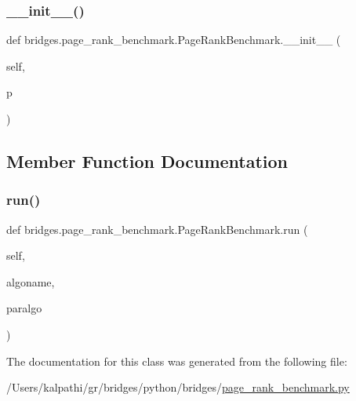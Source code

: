 \subsubsection{\texorpdfstring{\_\_init\_\_()}{\_\_init\_\_()}}
{\footnotesize\ttfamily def bridges.\+page\+\_\+rank\+\_\+benchmark.\+Page\+Rank\+Benchmark.\+\_\+\+\_\+init\+\_\+\+\_\+ (\begin{DoxyParamCaption}\item[{}]{self,  }\item[{}]{p }\end{DoxyParamCaption})}



\subsection{Member Function Documentation}
\mbox{\label{classbridges_1_1page__rank__benchmark_1_1_page_rank_benchmark_ab1e8da6b9ec3e3858f23bcffb42c5f6c}} 
\subsubsection{\texorpdfstring{run()}{run()}}
{\footnotesize\ttfamily def bridges.\+page\+\_\+rank\+\_\+benchmark.\+Page\+Rank\+Benchmark.\+run (\begin{DoxyParamCaption}\item[{}]{self,  }\item[{}]{algoname,  }\item[{}]{paralgo }\end{DoxyParamCaption})}



The documentation for this class was generated from the following file\+:\begin{DoxyCompactItemize}
\item 
/\+Users/kalpathi/gr/bridges/python/bridges/\mbox{\hyperlink{page__rank__benchmark_8py}{page\+\_\+rank\+\_\+benchmark.\+py}}\end{DoxyCompactItemize}
